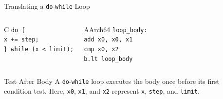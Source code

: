 \documentclass[aspectratio=169,11pt,t]{beamer}
\newcommand{\code}[1]{\texttt{#1}}
\begin{document}
\begin{frame}{Translating a \code{do}-\code{while} Loop}
\begin{columns}[T,onlytextwidth]
\begin{block}{C}
\small
\hspace{0.4cm}\code{do \{}\\[0.08cm]
\hspace{0.8cm}\code{x += step;}\\[0.08cm]
\hspace{0.4cm}\code{\} while (x < limit);}
\end{block}
\begin{block}{AArch64}
\small
\hspace{0.5cm}\code{loop\_body:}\\[0.08cm]
\hspace{1.0cm}\code{add x0, x0, x1}\\[0.08cm]
\hspace{1.0cm}\code{cmp x0, x2}\\[0.08cm]
\hspace{1.0cm}\code{b.lt loop\_body}
\end{block}
\end{columns}
\vspace{0.15cm}
\begin{block}{Test After Body}
A \code{do}-\code{while} loop executes the body once before its first condition test. Here, \code{x0}, \code{x1}, and \code{x2} represent \code{x}, \code{step}, and \code{limit}.
\end{block}
\end{frame}



\end{document}
